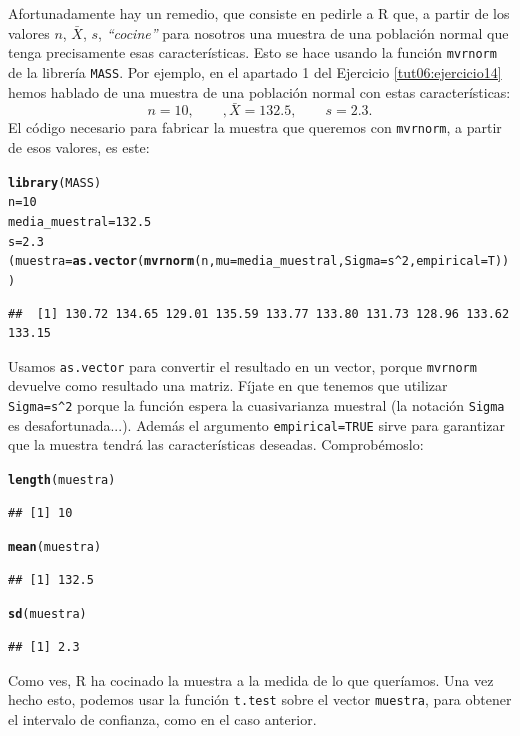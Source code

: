 \documentclass[10pt,a4paper]{article}\usepackage[]{graphicx}\usepackage[]{color}
\makeatletter
\newcommand{\hlnum}[1]{\textcolor[rgb]{0.686,0.059,0.569}{#1}}%
\newcommand{\hlopt}[1]{\textcolor[rgb]{0,0,0}{#1}}%
\newcommand{\hlstd}[1]{\textcolor[rgb]{0.345,0.345,0.345}{#1}}%
\newcommand{\hlkwb}[1]{\textcolor[rgb]{0.69,0.353,0.396}{#1}}%
\newcommand{\hlkwc}[1]{\textcolor[rgb]{0.333,0.667,0.333}{#1}}%
\newcommand{\hlkwd}[1]{\textcolor[rgb]{0.737,0.353,0.396}{\textbf{#1}}}%
\newenvironment{kframe}{%
 \def\at@end@of@kframe{}%
 \ifinner\ifhmode%
  \def\at@end@of@kframe{\end{minipage}}%
  \begin{minipage}{\columnwidth}%
 \fi\fi%
 \def\FrameCommand##1{\hskip\@totalleftmargin \hskip-\fboxsep
 \colorbox{shadecolor}{##1}\hskip-\fboxsep
     \hskip-\linewidth \hskip-\@totalleftmargin \hskip\columnwidth}%
 \MakeFramed {\advance\hsize-\width
   \@totalleftmargin\z@ \linewidth\hsize
   \@setminipage}}%
 {\par\unskip\endMakeFramed%
 \at@end@of@kframe}
\newenvironment{knitrout}{}{} %
\makeatother
\begin{document}
Afortunadamente hay un remedio, que consiste en pedirle a R que, a partir de los valores $n$, $\bar X$, $s$,  {\em ``cocine''} para nosotros una muestra de una población normal que tenga precisamente esas características. Esto se hace usando la función {\tt mvrnorm} de la librería {\tt MASS}.  Por ejemplo, en el apartado 1 del Ejercicio \ref{tut06:ejercicio14} hemos hablado de una muestra de una población normal con estas características:
\[n = 10, \qquad, \bar X = 132.5, \qquad s=2.3.\]
El código necesario para fabricar la muestra que queremos con {\tt mvrnorm}, a partir de esos valores, es este:
\begin{knitrout}
\color{fgcolor}\begin{kframe}
\begin{alltt}
\hlkwd{library}\hlstd{(MASS)}
\hlstd{n} \hlkwb{=} \hlnum{10}
\hlstd{media_muestral} \hlkwb{=} \hlnum{132.5}
\hlstd{s} \hlkwb{=} \hlnum{2.3}
\hlstd{(muestra} \hlkwb{=} \hlkwd{as.vector}\hlstd{(}\hlkwd{mvrnorm}\hlstd{(n,} \hlkwc{mu}\hlstd{=media_muestral,} \hlkwc{Sigma}\hlstd{=s}\hlopt{^}\hlnum{2}\hlstd{,} \hlkwc{empirical}\hlstd{=T)))}
\end{alltt}
\begin{verbatim}
##  [1] 130.72 134.65 129.01 135.59 133.77 133.80 131.73 128.96 133.62 133.15
\end{verbatim}
\end{kframe}
\end{knitrout}
Usamos {\tt as.vector} para convertir el resultado en un vector, porque {\tt mvrnorm} devuelve como resultado una matriz. Fíjate en que tenemos que utilizar \verb/Sigma=s^2/ porque la función espera la cuasivarianza muestral (la notación {\tt Sigma} es desafortunada...). Además el argumento {\tt empirical=TRUE} sirve para garantizar que la muestra tendrá las características deseadas. Comprobémoslo:
\begin{knitrout}
\color{fgcolor}\begin{kframe}
\begin{alltt}
\hlkwd{length}\hlstd{(muestra)}
\end{alltt}
\begin{verbatim}
## [1] 10
\end{verbatim}
\begin{alltt}
\hlkwd{mean}\hlstd{(muestra)}
\end{alltt}
\begin{verbatim}
## [1] 132.5
\end{verbatim}
\begin{alltt}
\hlkwd{sd}\hlstd{(muestra)}
\end{alltt}
\begin{verbatim}
## [1] 2.3
\end{verbatim}
\end{kframe}
\end{knitrout}
Como ves, R ha cocinado la muestra a la medida de lo que queríamos. Una vez hecho esto, podemos usar la función {\tt t.test} sobre el vector {\tt muestra}, para obtener el intervalo de confianza, como en el caso anterior.
\end{document}
